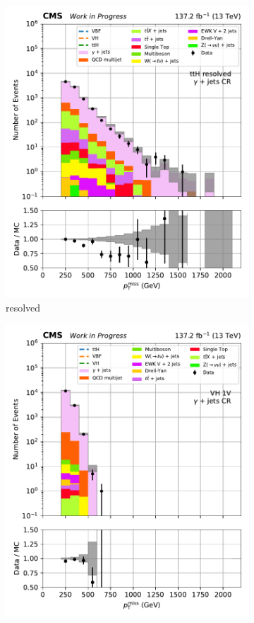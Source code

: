 \begin{figure}[htbp]
\begin{subfigure}[b]{0.24\textwidth}
        \includegraphics[width=\textwidth]{figures/region_plots/2016to18/region_5/ttH_resolved.pdf}
        \caption{\ttH resolved}
    \end{subfigure}
    \begin{subfigure}[b]{0.24\textwidth}
        \includegraphics[width=\textwidth]{figures/region_plots/2016to18/region_5/VH_1V.pdf}

\end{subfigure}
\end{figure}
